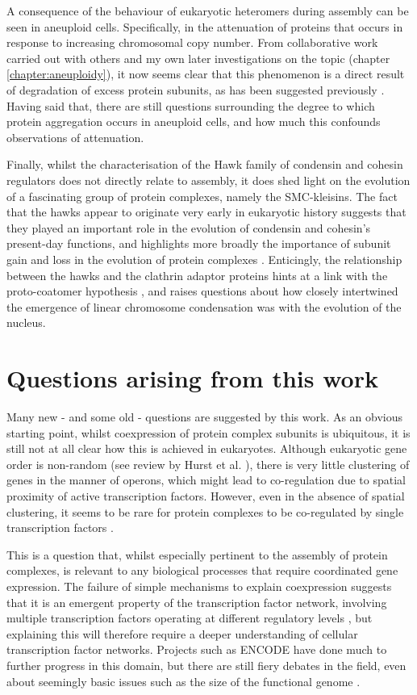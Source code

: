 \documentclass[a4paper,11pt,twoside,openright]{scrbook}
\begin{document}
A consequence of the behaviour of eukaryotic heteromers during assembly can be seen in aneuploid cells. Specifically, in the attenuation of proteins that occurs in response to increasing chromosomal copy number. From collaborative work carried out with others \cite{McShane2016} and my own later investigations on the topic (chapter \ref{chapter:aneuploidy}), it now seems clear that this phenomenon is a direct result of degradation of excess protein subunits, as has been suggested previously \cite{Dephoure2014,Mueller2015,Goncalves2017}. Having said that, there are still questions surrounding the degree to which protein aggregation occurs in aneuploid cells, and how much this confounds observations of attenuation.

Finally, whilst the characterisation of the Hawk family of condensin and cohesin regulators does not directly relate to assembly, it does shed light on the evolution of a fascinating group of protein complexes, namely the SMC-kleisins. The fact that the hawks appear to originate very early in eukaryotic history suggests that they played an important role in the evolution of condensin and cohesin's present-day functions, and highlights more broadly the importance of subunit gain and loss in the evolution of protein complexes \cite{Seidl2009,Wan2015}. Enticingly, the relationship between the hawks and the clathrin adaptor proteins hints at a link with the proto-coatomer hypothesis \cite{Devos2006,Field2011}, and raises questions about how closely intertwined the emergence of linear chromosome condensation was with the evolution of the nucleus.

\section{Questions arising from this work}
Many new - and some old - questions are suggested by this work. As an obvious starting point, whilst coexpression of protein complex subunits is ubiquitous, it is still not at all clear how this is achieved in eukaryotes. Although eukaryotic gene order is non-random (see review by Hurst et al. \cite{Hurst2004}), there is very little clustering of genes in the manner of operons, which might lead to co-regulation due to spatial proximity of active transcription factors. However, even in the absence of spatial clustering, it seems to be rare for protein complexes to be co-regulated by single transcription factors \cite{Tan2007}.

This is a question that, whilst especially pertinent to the assembly of protein complexes, is relevant to any biological processes that require coordinated gene expression. The failure of simple mechanisms to explain coexpression suggests that it is an emergent property of the transcription factor network, involving multiple transcription factors operating at different regulatory levels \cite{Tsai2007,Muhammad2017}, but explaining this will therefore require a deeper understanding of cellular transcription factor networks. Projects such as ENCODE have done much to further progress in this domain, but there are still fiery debates in the field, even about seemingly basic issues such as the size of the functional genome \cite{Neph2012,Graur2013,Graur2017}.
\end{document}
